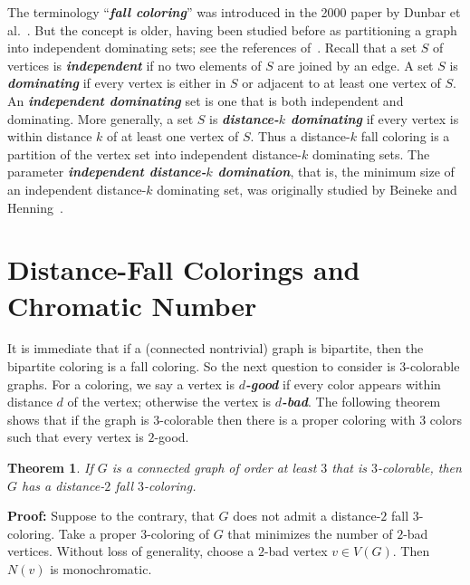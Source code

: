 \documentclass[10pt,a4paper]{amsart}
\newtheorem{theorem}{Theorem}[section]
\numberwithin{equation}{theorem}
\newcommand{\dd}[1]{\textbf{\textit{#1}}}
\begin{document}
The terminology ``\dd{fall coloring}'' was introduced in the 2000 paper by Dunbar et al.~\cite{DHHJKLR}. 
But the concept is older, having been studied before as partitioning a graph into independent dominating sets;
see the references of~\cite{DHHJKLR}. Recall that a set $S$ of vertices is \dd{independent} if no two elements of $S$ are joined by an edge.
A set $S$ is \dd{dominating} if every vertex is either in $S$ or adjacent to at least one vertex of $S$.
An \dd{independent dominating} set is one that is both independent and dominating.
More generally, a set $S$ is \dd{distance-$k$ dominating} if every vertex is within distance $k$ of at least
one vertex of $S$. Thus a distance-$k$ fall coloring is a partition of the vertex set into independent distance-$k$ dominating sets.
The parameter \dd{independent distance-$k$ domination}, that is, the  
minimum size of an independent distance-$k$ dominating set,
was originally studied by Beineke and Henning~\cite{BH}.





 \section{Distance-Fall Colorings and Chromatic Number}\label{dfc&cn}

It is immediate that  if a (connected nontrivial) graph is bipartite, then the bipartite coloring is a fall coloring.
So the next question to consider is $3$-colorable graphs.
For a coloring, we say a vertex is \dd{$d$-good} if every color appears within distance $d$ of the vertex; otherwise the vertex
is \dd{$d$-bad}. The following theorem shows that if the graph is $3$-colorable then 
 there is a proper coloring with $3$ colors such that every vertex is $2$-good.

\begin{theorem} \label{t:threeGood}
If $G$ is a connected graph of order at least $3$ that is $3$-colorable, then $G$ has a distance-$2$ fall $3$-coloring.
\end{theorem}

{\bf Proof:} 
Suppose to the contrary, that $G$ does not admit a distance-$2$ fall $3$-coloring. 
Take a proper $3$-coloring of $G$ that minimizes the number of $2$-bad vertices. 
Without loss of generality, choose a $2$-bad vertex $v \in V(G)$. 
Then $N(v)$ is monochromatic.
\end{document}
